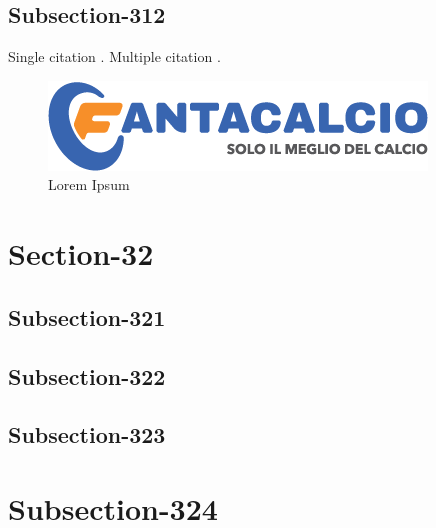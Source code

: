 \documentclass[a4paper,10pt]{report}
\begin{document}
\subsection{Subsection-312}\label{subsec:subsection-312}

Single citation \cite{knuth74}. 
Multiple citation \cite{knuth92,lamport94}.

\blindtext %

\begin{figure}[h]
  \center
  \includegraphics[width=0.85\linewidth]{logo-fantacalcio}
  \caption{Lorem Ipsum}
  \label{fig:{lorem}}
\end{figure}


\section{Section-32}\label{sec:section-32}
\subsection{Subsection-321}\label{subsec:subsection-321}

\blindtext %


\subsection{Subsection-322}\label{subsec:subsection-322}

\blindtext %


\subsection{Subsection-323}\label{subsec:subsection-323}

\blindtext %


\section{Subsection-324}\label{sec:subsection-324}

\blindtext %
\end{document}
